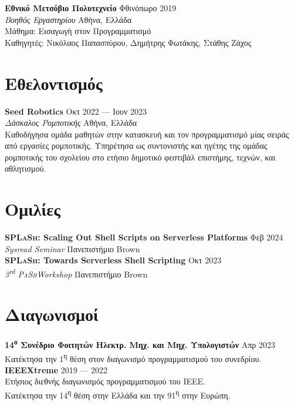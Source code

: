\documentclass[margin, 10pt]{resume}
\newcommand{\pash}{\textsc{PaSh}}
\newcommand{\sectionVSpace}{\vspace{-3.5ex}} %
\newcommand{\splash}{\textsc{SPLaSh}\xspace}
\newcommand{\competition}[1]{\textbf{#1}\xspace}
\newcommand{\event}[1]{\textit{#1}\xspace}
\newcommand{\institution}[1]{\textbf{#1}\xspace}
\newcommand{\ordinal}[1]{\textsuperscript{#1}\xspace}
\newcommand{\rSection}[1]{\sectionVSpace\section{#1}\xspace}
\newcommand{\role}[1]{\textit{#1}\xspace}
\newcommand{\stitle}[1]{#1:\xspace}
\newcommand{\talk}[1]{\textbf{#1}\xspace}
\begin{document}
\begin{resume}
    \institution{Εθνικό Μετσόβιο Πολυτεχνείο} \hfill Φθινόπωρο 2019 \\
    \role{Βοηθός Εργαστηρίου} \hfill Αθήνα, Ελλάδα \\
    \stitle{Μάθημα} Εισαγωγή στον Προγραμματισμό \\
    \stitle{Καθηγητές} Νικόλαος Παπασπύρου, Δημήτρης Φωτάκης, Στάθης Ζάχος \\

    \rSection{Εθελοντισμός}

    \institution{Seed Robotics} \hfill Οκτ 2022 --- Ιουν 2023 \\
    \role{Δάσκαλος Ρομποτικής} \hfill Αθήνα, Ελλάδα \\
    Καθοδήγησα ομάδα μαθητών στην κατασκευή και τον προγραμματισμό μίας σειράς από εργασίες ρομποτικής. Υπηρέτησα ως συντονιστής και ηγέτης της ομάδας ρομποτικής του σχολείου στο ετήσιο δημοτικό φεστιβάλ επιστήμης, τεχνών, και αθλητισμού. \\

    \rSection{Ομιλίες}


    \talk{\splash: Scaling Out Shell Scripts on Serverless Platforms} \hfill Φεβ 2024 \\
    \event{Sysread Seminar} \hfill Πανεπιστήμιο Brown \\


    \talk{\splash: Towards Serverless Shell Scripting} \hfill Οκτ 2023 \\
    \event{3\ordinal{rd} \pash Workshop} \hfill Πανεπιστήμιο Brown \\

    \rSection{Διαγωνισμοί}

    \competition{14\ordinal{ο} Συνέδριο Φοιτητών Ηλεκτρ. Μηχ. και Μηχ. Υπολογιστών} \hfill Απρ 2023 \\
    Κατέκτησα την 1\ordinal{η} θέση στον διαγωνισμό προγραμματισμού του συνεδρίου. \\

    \competition{IEEEXtreme} \hfill 2019 --- 2022 \\
    Ετήσιος διεθνής διαγωνισμός προγραμματισμού του IEEE. \\
    Κατέκτησα την 14\ordinal{η} θέση στην Ελλάδα και την 91\ordinal{η} στην Ευρώπη. \\


\end{resume}
\end{document}
